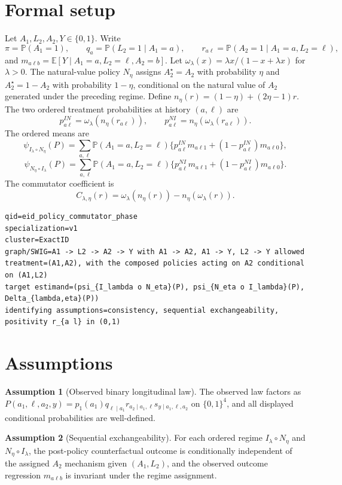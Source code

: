 \documentclass[11pt]{article}
\newcommand{\E}{\mathbb{E}}
\renewcommand{\Pr}{\mathbb{P}}
\theoremstyle{definition}
\newtheorem{assumption}{Assumption}
\theoremstyle{plain}
\theoremstyle{remark}
\begin{document}
\section{Formal setup}
Let \(A_1,L_2,A_2,Y\in\{0,1\}\). Write
\[
\pi=\Pr(A_1=1),\qquad q_a=\Pr(L_2=1\mid A_1=a),\qquad r_{a\ell}=\Pr(A_2=1\mid A_1=a,L_2=\ell),
\]
and \(m_{a\ell b}=\E[Y\mid A_1=a,L_2=\ell,A_2=b]\). Let \(\omega_\lambda(x)=\lambda x/(1-x+\lambda x)\) for \(\lambda>0\). The natural-value policy \(N_\eta\) assigns \(A_2^\star=A_2\) with probability \(\eta\) and \(A_2^\star=1-A_2\) with probability \(1-\eta\), conditional on the natural value of \(A_2\) generated under the preceding regime. Define \(n_\eta(r)=(1-\eta)+(2\eta-1)r\). The two ordered treatment probabilities at history \((a,\ell)\) are
\[
p^{IN}_{a\ell}=\omega_\lambda(n_\eta(r_{a\ell})),\qquad
p^{NI}_{a\ell}=n_\eta(\omega_\lambda(r_{a\ell})).
\]
The ordered means are
\[
\psi_{I_\lambda\circ N_\eta}(P)=\sum_{a,\ell}\Pr(A_1=a,L_2=\ell)\{p^{IN}_{a\ell}m_{a\ell1}+(1-p^{IN}_{a\ell})m_{a\ell0}\},
\]
\[
\psi_{N_\eta\circ I_\lambda}(P)=\sum_{a,\ell}\Pr(A_1=a,L_2=\ell)\{p^{NI}_{a\ell}m_{a\ell1}+(1-p^{NI}_{a\ell})m_{a\ell0}\}.
\]
The commutator coefficient is
\[
C_{\lambda,\eta}(r)=\omega_\lambda(n_\eta(r))-n_\eta(\omega_\lambda(r)).
\]

\begin{verbatim}
qid=eid_policy_commutator_phase
specialization=v1
cluster=ExactID
graph/SWIG=A1 -> L2 -> A2 -> Y with A1 -> A2, A1 -> Y, L2 -> Y allowed
treatment=(A1,A2), with the composed policies acting on A2 conditional on (A1,L2)
target estimand=(psi_{I_lambda o N_eta}(P), psi_{N_eta o I_lambda}(P), Delta_{lambda,eta}(P))
identifying assumptions=consistency, sequential exchangeability, positivity r_{a l} in (0,1)
\end{verbatim}

\section{Assumptions}
\begin{assumption}[Observed binary longitudinal law]\label{ass:binary-law}
The observed law factors as \(P(a_1,\ell,a_2,y)=p_1(a_1)q_{\ell\mid a_1}r_{a_2\mid a_1,\ell}s_{y\mid a_1,\ell,a_2}\) on \(\{0,1\}^4\), and all displayed conditional probabilities are well-defined.
\end{assumption}

\begin{assumption}[Sequential exchangeability]\label{ass:seq-exch}
For each ordered regime \(I_\lambda\circ N_\eta\) and \(N_\eta\circ I_\lambda\), the post-policy counterfactual outcome is conditionally independent of the assigned \(A_2\) mechanism given \((A_1,L_2)\), and the observed outcome regression \(m_{a\ell b}\) is invariant under the regime assignment.
\end{assumption}
\end{document}
